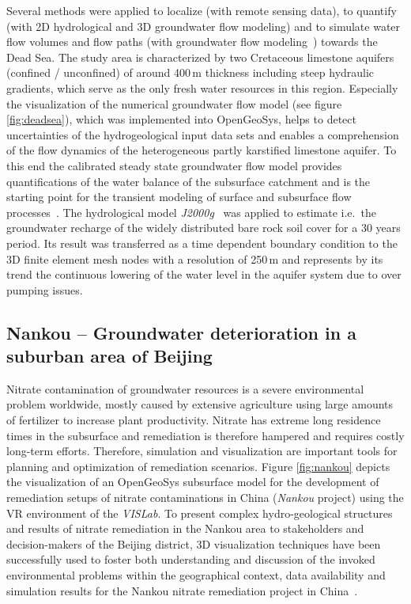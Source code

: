 \documentclass[twocolumn]{svjour3}          %
\begin{document}
Several methods were applied to localize (with remote sensing data), to quantify (with 2D hydrological and 3D groundwater flow modeling) and to simulate water flow volumes and flow paths (with groundwater flow modeling~\cite{graebe:modelcare}) towards the Dead Sea. The study area is characterized by two Cretaceous limestone aquifers (confined / unconfined) of around 400\,m thickness including steep hydraulic gradients, which serve as the only fresh water resources in this region. Especially the visualization of the numerical groundwater flow model (see figure \ref{fig:deadsea}), which was implemented into OpenGeoSys, helps to detect uncertainties of the hydrogeological input data sets and enables a comprehension of the flow dynamics of the heterogeneous partly karstified limestone aquifer. To this end the calibrated steady state groundwater flow model provides quantifications of the water balance of the subsurface catchment and is the starting point for the transient modeling of surface and subsurface flow processes~\cite{graebe:wessti}. The hydrological model \emph{J2000g}~\cite{KrauseKralisch:2005, Krause:2001} was applied to estimate i.e.~the groundwater recharge of the widely distributed bare rock soil cover for a 30 years period. Its result was transferred as a time dependent boundary condition to the 3D finite element mesh nodes with a resolution of 250\,m and represents by its trend the continuous lowering of the water level in the aquifer system due to over pumping issues.

\subsection{Nankou -- Groundwater deterioration in a suburban area of Beijing}
\label{nankou}

Nitrate contamination of groundwater resources is a severe environmental problem worldwide, mostly caused by extensive agriculture using large amounts of fertilizer to increase plant productivity. Nitrate has extreme long residence times in the subsurface and remediation is therefore hampered and requires costly long-term efforts. Therefore, simulation and visualization are important tools for planning and optimization of remediation scenarios. Figure \ref{fig:nankou} depicts the visualization of an OpenGeoSys subsurface model for the development of remediation setups of nitrate contaminations in China (\emph{Nankou} project) using the VR environment of the \emph{VISLab}. To present complex hydro-geological structures and results of nitrate remediation in the Nankou area to stakeholders and decision-makers of the Beijing district, 3D visualization techniques have been successfully used to foster both understanding and discussion of the invoked environmental problems within the geographical context, data availability and simulation results for the Nankou nitrate remediation project in China~\cite{sun:ees}.
\end{document}
